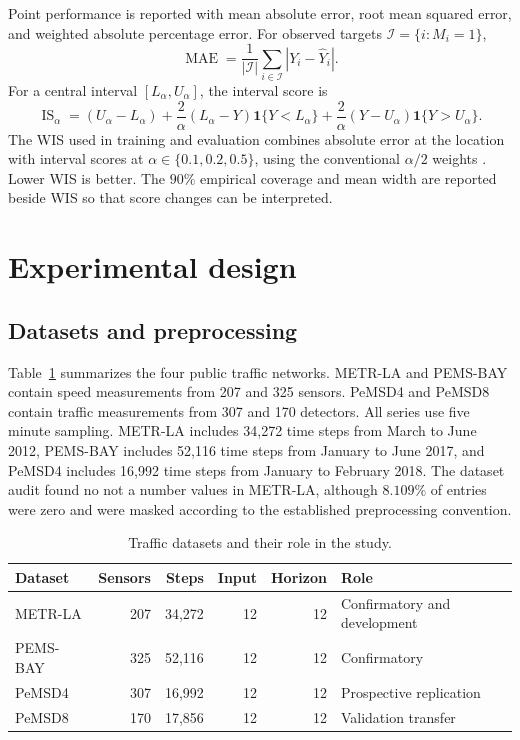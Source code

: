 \documentclass[pdflatex,sn-mathphys-num]{sn-jnl}
\begin{document}
Point performance is reported with mean absolute error, root mean squared error, and weighted absolute percentage error. For observed targets \(\mathcal{I}=\{i:M_i=1\}\),
\begin{equation}
 \operatorname{MAE}=\frac{1}{|\mathcal{I}|}\sum_{i\in\mathcal{I}}
 |Y_i-\widehat{Y}_i|.
\label{eq:mae}
\end{equation}
For a central interval \([L_\alpha,U_\alpha]\), the interval score is
\begin{equation}
 \operatorname{IS}_{\alpha}=(U_\alpha-L_\alpha)
 +\frac{2}{\alpha}(L_\alpha-Y)\mathbf{1}\{Y<L_\alpha\}
 +\frac{2}{\alpha}(Y-U_\alpha)\mathbf{1}\{Y>U_\alpha\}.
\label{eq:is}
\end{equation}
The WIS used in training and evaluation combines absolute error at the location with interval scores at \(\alpha\in\{0.1,0.2,0.5\}\), using the conventional \(\alpha/2\) weights \cite{bracher2021wis}. Lower WIS is better. The \(90\%\) empirical coverage and mean width are reported beside WIS so that score changes can be interpreted.

\section{Experimental design}\label{sec:experiment}

\subsection{Datasets and preprocessing}\label{subsec:data}

Table~\ref{tab:datasets} summarizes the four public traffic networks. METR-LA and PEMS-BAY contain speed measurements from 207 and 325 sensors. PeMSD4 and PeMSD8 contain traffic measurements from 307 and 170 detectors. All series use five minute sampling. METR-LA includes 34,272 time steps from March to June 2012, PEMS-BAY includes 52,116 time steps from January to June 2017, and PeMSD4 includes 16,992 time steps from January to February 2018. The dataset audit found no not a number values in METR-LA, although \(8.109\%\) of entries were zero and were masked according to the established preprocessing convention.

\begin{table}[t]
\caption{Traffic datasets and their role in the study.}\label{tab:datasets}
\centering
\small
\begin{tabular}{lrrrrl}
\toprule
Dataset & Sensors & Steps & Input & Horizon & Role \\
\midrule
METR-LA & 207 & 34,272 & 12 & 12 & Confirmatory and development \\
PEMS-BAY & 325 & 52,116 & 12 & 12 & Confirmatory \\
PeMSD4 & 307 & 16,992 & 12 & 12 & Prospective replication \\
PeMSD8 & 170 & 17,856 & 12 & 12 & Validation transfer \\
\bottomrule
\end{tabular}
\end{table}
\end{document}
